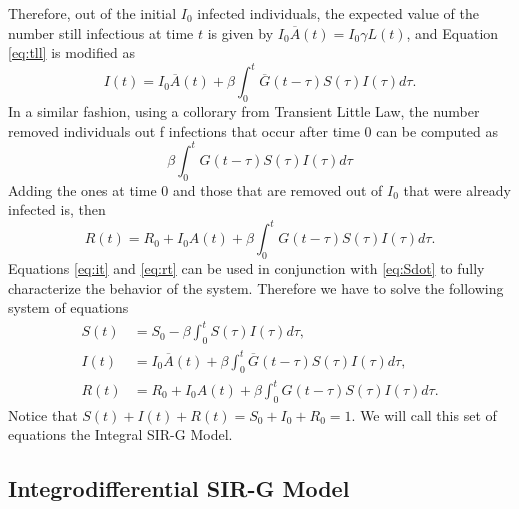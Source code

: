\documentclass[twoside,USenglish,10pt]{article}
\newcommand{\Ab}{\overline{A}\xspace}
\newcommand{\Gb}{\overline{G}\xspace}
\begin{document}
Therefore, out of the initial $I_0$ infected individuals, the expected value of the number still infectious at time $t$ is given by $I_0\Ab(t)=I_0\gamma L(t)$, and Equation \eqref{eq:tll} is modified as
\begin{equation}
	I(t) = I_0\Ab(t) + \beta\int_0^t \Gb(t-\tau) S(\tau)I(\tau)d\tau.   \label{eq:it}
\end{equation}
In a similar fashion, using a collorary from Transient Little Law, the number removed individuals out f infections that occur after time $0$ can be computed as 
\[ \beta\int_0^t G(t-\tau) S(\tau)I(\tau)d\tau\]
Adding the ones at time $0$ and those that are removed out of $I_0$ that were already infected is, then
\begin{equation}
	R(t) = R_0 + I_0A(t) + \beta\int_0^t G(t-\tau) S(\tau)I(\tau)d\tau.   \label{eq:rt}
\end{equation}
Equations \eqref{eq:it} and \eqref{eq:rt} can be used in conjunction with \eqref{eq:Sdot} to fully characterize the behavior of the system. Therefore we have to solve the following system of equations
\begin{subequations}
\begin{align}
S(t) &= S_0 - \beta\int_0^t  S(\tau)I(\tau)d\tau, \label{eq:st2} \\
I(t) &= I_0 \Ab(t) + \beta\int_0^t \Gb(t-\tau) S(\tau)I(\tau)d\tau, \label{eq:it2} \\
R(t) &= R_0  + I_0A(t) +  \beta\int_0^t G(t-\tau) S(\tau)I(\tau)d\tau.   \label{eq:rt2}
\end{align}
\end{subequations}
Notice that $S(t)+I(t)+R(t)=S_0+I_0+R_0=1.$ We will call this set of equations the Integral SIR-G Model.

\subsection{Integrodifferential SIR-G Model}
\end{document}

